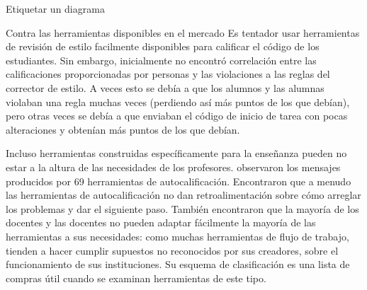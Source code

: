 \begin{aside}{Etiquetar un diagrama}
{\begin{aside}{Contra las herramientas disponibles en el mercado}
Es tentador usar herramientas de revisión de estilo facilmente disponibles para calificar el código de los estudiantes.
Sin embargo,
\cite{Nutb2016} inicialmente no encontró correlación entre las calificaciones proporcionadas por personas 
y las violaciones a las reglas del corrector de estilo.
A veces esto se debía a que los alumnos y las alumnas violaban una regla muchas veces 
(perdiendo así más puntos de los que debían), 
pero otras veces se debía a que enviaban el código de inicio de tarea con pocas alteraciones y obtenían más puntos de los que debían.

 Incluso herramientas construidas específicamente para la enseñanza pueden no estar a la altura de las necesidades de los profesores.
   \cite{Keun2016a,Keun2016b}  observaron los mensajes producidos por 69 herramientas de autocalificación.
  Encontraron que a menudo las herramientas de autocalificación no dan retroalimentación sobre cómo arreglar los problemas y dar el siguiente paso.
    También encontraron que la mayoría de los docentes y las docentes no pueden adaptar fácilmente la mayoría de las herramientas a sus necesidades: 
como muchas herramientas de flujo de trabajo, tienden a hacer cumplir supuestos no reconocidos por sus creadores, sobre el funcionamiento de sus instituciones.
  Su esquema de clasificación es una lista de compras útil cuando se examinan herramientas de este tipo.
\end{aside}

}
\end{aside}
